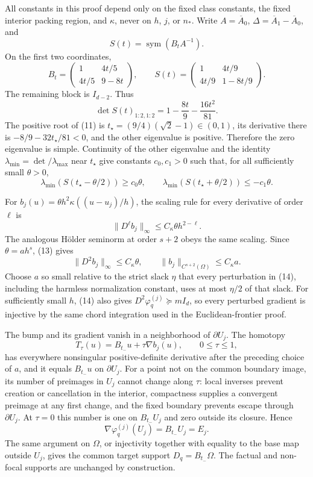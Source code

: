 All constants in this proof depend only on the fixed class constants, the fixed interior packing region, and \(\kappa\), never on \(h\), \(j\), or \(n_\ast\).  Write \(A=\overline A_0\), \(\Delta=\overline A_1-\overline A_0\), and
\[
 S(t)=\operatorname{sym}(B_tA^{-1}).
\]
On the first two coordinates,
\[
 B_t=
 \begin{pmatrix}1&4t/5\\4t/5&9-8t\end{pmatrix},
 \qquad
 S(t)=
 \begin{pmatrix}1&4t/9\\4t/9&1-8t/9\end{pmatrix}.
 \tag{10}
\]
The remaining block is \(I_{d-2}\).  Thus
\[
 \det S(t)_{1:2,1:2}=1-\frac{8t}{9}-\frac{16t^2}{81}.
 \tag{11}
\]
The positive root of (11) is \(t_\star=(9/4)(\sqrt2-1)\in(0,1)\), its derivative there is \(-8/9-32t_\star/81<0\), and the other eigenvalue is positive.  Therefore the zero eigenvalue is simple.  Continuity of the other eigenvalue and the identity \(\lambda_{\min}=\det/\lambda_{\max}\) near \(t_\star\) give constants \(c_0,c_1>0\) such that, for all sufficiently small \(\theta>0\),
\[
 \lambda_{\min}(S(t_\star-\theta/2))\ge c_0\theta,
 \qquad
 \lambda_{\min}(S(t_\star+\theta/2))\le-c_1\theta.
 \tag{12}
\]

For \(b_j(u)=\theta h^2\kappa((u-u_j)/h)\), the scaling rule for every derivative of order \(\ell\) is
\[
 \lVert D^\ell b_j\rVert_\infty
 \le C_\kappa\theta h^{2-\ell}.
 \tag{13}
\]
The analogous Hölder seminorm at order \(s+2\) obeys the same scaling.  Since \(\theta=ah^s\), (13) gives
\[
 \lVert D^2b_j\rVert_\infty\le C_\kappa\theta,
 \qquad
 \lVert b_j\rVert_{C^{s+2}(\Omega)}\le C_\kappa a.
 \tag{14}
\]
Choose \(a\) so small relative to the strict slack \(\eta\) that every perturbation in (14), including the harmless normalization constant, uses at most \(\eta/2\) of that slack.  For sufficiently small \(h\), (14) also gives \(D^2\varphi_q^{(j)}\succeq mI_d\), so every perturbed gradient is injective by the same chord integration used in the Euclidean-frontier proof.

The bump and its gradient vanish in a neighborhood of \(\partial U_j\).  The homotopy
\[
 T_\tau(u)=B_{t_-}u+\tau\nabla b_j(u),\qquad 0\le\tau\le1,
\]
has everywhere nonsingular positive-definite derivative after the preceding choice of \(a\), and it equals \(B_{t_-}u\) on \(\partial U_j\).  For a point not on the common boundary image, its number of preimages in \(U_j\) cannot change along \(\tau\): local inverses prevent creation or cancellation in the interior, compactness supplies a convergent preimage at any first change, and the fixed boundary prevents escape through \(\partial U_j\).  At \(\tau=0\) this number is one on \(B_{t_-}U_j\) and zero outside its closure.  Hence
\[
 \nabla\varphi_q^{(j)}(U_j)=B_{t_-}U_j=E_j.
 \tag{15}
\]
The same argument on \(\Omega\), or injectivity together with equality to the base map outside \(U_j\), gives the common target support \(D_q=B_{t_-}\Omega\).  The factual and non-focal supports are unchanged by construction.

